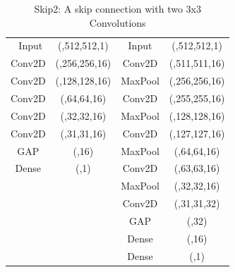 \documentclass[
a4paper, 
12pt,
grayscalebody, %
abstract=on,
twoside, BCOR10mm, 12pt, DIV13,headinclude, footexclude, final, abstracton, openright
]{ibireprt}
\numberwithin{equation}{chapter}
\numberwithin{table}{chapter}
\numberwithin{figure}{chapter}
\numberwithin{algorithm}{chapter}
\numberwithin{example}{chapter}
\numberwithin{example}{chapter}
\begin{document}
\begin{table}
\begin{tabular}{cccc}
		\cmidrule(l){1-2} \cmidrule(l){3-4}\
		Input&(,512,512,1)&Input&(,512,512,1)\\
		\cmidrule(l){1-2} \cmidrule(l){3-4}
		Conv2D& (,256,256,16) &Conv2D	& (,511,511,16)\\
		\cmidrule(l){1-2} \cmidrule(l){3-4}
		Conv2D&(,128,128,16)&MaxPool&(,256,256,16)\\
		\cmidrule(l){1-2} \cmidrule(l){3-4}
		Conv2D&(,64,64,16)&Conv2D&(,255,255,16)\\
		\cmidrule(l){1-2} \cmidrule(l){3-4}
		Conv2D&(,32,32,16)&MaxPool&(,128,128,16)\\
		\cmidrule(l){1-2} \cmidrule(l){3-4}
		Conv2D&(,31,31,16)&Conv2D&(,127,127,16)\\
		\cmidrule(l){1-2} \cmidrule(l){3-4}
		GAP&(,16)&MaxPool&(,64,64,16)\\
		\cmidrule(l){1-2} \cmidrule(l){3-4}
		Dense&(,1)&Conv2D&(,63,63,16)\\
		 \cmidrule(l){3-4}
		&&MaxPool&(,32,32,16)\\
		 \cmidrule(l){3-4}
		&&Conv2D&(,31,31,32)\\
		 \cmidrule(l){3-4}
		&&GAP&(,32)\\
		 \cmidrule(l){3-4}
		&&Dense&(,16)\\
		\cmidrule(l){3-4}
		&&Dense&(,1)\\
	\end{tabular}
	\caption{Skip2: A skip connection with two 3x3 Convolutions}
\end{table}
\end{document}
